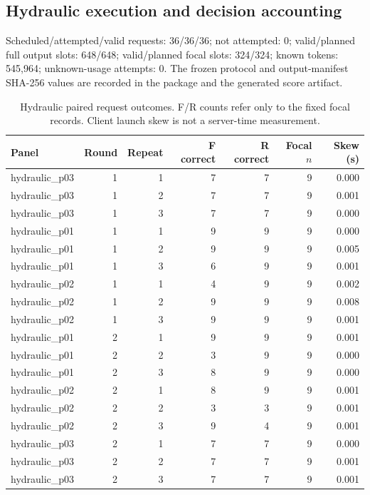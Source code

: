 \documentclass[11pt,a4paper]{article}
\begin{document}
\subsection{Hydraulic execution and decision accounting}

Scheduled/attempted/valid requests: 36/36/36; not attempted: 0; valid/planned full output slots: 648/648; valid/planned focal slots: 324/324; known tokens: 545,964; unknown-usage attempts: 0. The frozen protocol and output-manifest SHA-256 values are recorded in the package and the generated score artifact.

\begin{table}[htbp]\centering\small
\caption{Hydraulic paired request outcomes. F/R counts refer only to the fixed focal records. Client launch skew is not a server-time measurement.}
\label{tab:policy_pairs_hydraulic}
\begin{tabular}{@{}lrrrrrr@{}}\toprule
Panel & Round & Repeat & F correct & R correct & Focal $n$ & Skew (s) \\\midrule
hydraulic\_p03 & 1 & 1 & 7 & 7 & 9 & 0.000 \\
hydraulic\_p03 & 1 & 2 & 7 & 7 & 9 & 0.001 \\
hydraulic\_p03 & 1 & 3 & 7 & 7 & 9 & 0.000 \\
hydraulic\_p01 & 1 & 1 & 9 & 9 & 9 & 0.000 \\
hydraulic\_p01 & 1 & 2 & 9 & 9 & 9 & 0.005 \\
hydraulic\_p01 & 1 & 3 & 6 & 9 & 9 & 0.001 \\
hydraulic\_p02 & 1 & 1 & 4 & 9 & 9 & 0.002 \\
hydraulic\_p02 & 1 & 2 & 9 & 9 & 9 & 0.008 \\
hydraulic\_p02 & 1 & 3 & 9 & 9 & 9 & 0.001 \\
hydraulic\_p01 & 2 & 1 & 9 & 9 & 9 & 0.001 \\
hydraulic\_p01 & 2 & 2 & 3 & 9 & 9 & 0.000 \\
hydraulic\_p01 & 2 & 3 & 8 & 9 & 9 & 0.000 \\
hydraulic\_p02 & 2 & 1 & 8 & 9 & 9 & 0.001 \\
hydraulic\_p02 & 2 & 2 & 3 & 3 & 9 & 0.001 \\
hydraulic\_p02 & 2 & 3 & 9 & 4 & 9 & 0.001 \\
hydraulic\_p03 & 2 & 1 & 7 & 7 & 9 & 0.000 \\
hydraulic\_p03 & 2 & 2 & 7 & 7 & 9 & 0.001 \\
hydraulic\_p03 & 2 & 3 & 7 & 7 & 9 & 0.001 \\
\bottomrule\end{tabular}\end{table}
\end{document}
